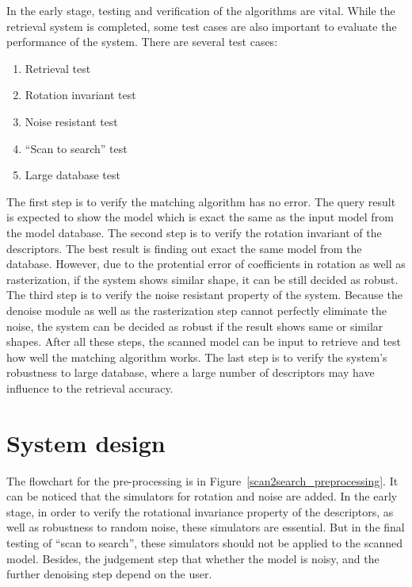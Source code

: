 In the early stage, testing and verification of the algorithms are vital. While the retrieval system is completed, some test cases are also important to evaluate the performance of the system. There are several test cases: 

\begin{enumerate}[1.]
\item Retrieval test
\item Rotation invariant test
\item Noise resistant test
\item ``Scan to search'' test
\item Large database test
\end{enumerate}

The first step is to verify the matching algorithm has no error. The query result is expected to show the model which is exact the same as the input model from the model database. The second step is to verify the rotation invariant of the descriptors. The best result is finding out exact the same model from the database. However, due to the protential error of coefficients in rotation as well as rasterization, if the system shows similar shape, it can be still decided as robust. The third step is to verify the noise resistant property of the system. Because the denoise module as well as the rasterization step cannot perfectly eliminate the noise, the system can be decided as robust if the result shows same or similar shapes. After all these steps, the scanned model can be input to retrieve and test how well the matching algorithm works. The last step is to verify the system's robustness to large database, where a large number of descriptors may have influence to the retrieval accuracy. 

\section{System design}

The flowchart for the pre-processing is in Figure~\ref{scan2search_preprocessing}. It can be noticed that the simulators for rotation and noise are added. In the early stage, in order to verify the rotational invariance property of the descriptors, as well as robustness to random noise, these simulators are essential. But in the final testing of ``scan to search'', these simulators should not be applied to the scanned model. Besides, the judgement step that whether the model is noisy, and the further denoising step depend on the user. 

